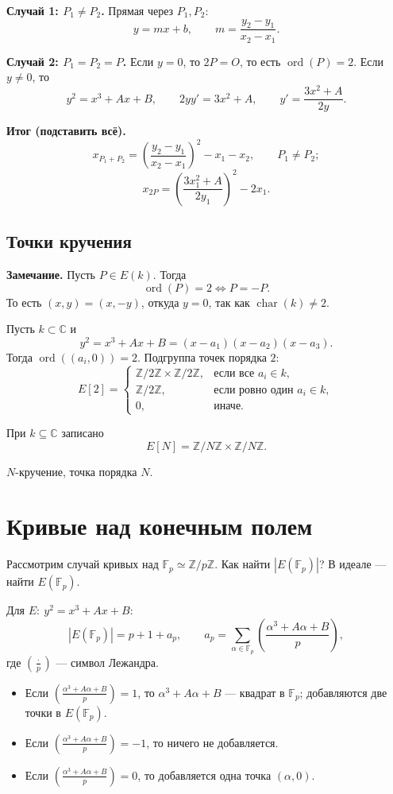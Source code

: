 \documentclass[12pt,a4paper]{article}
\newcommand{\Z}{\mathbb Z}
\newcommand{\CC}{\mathbb C}
\newcommand{\F}{\mathbb F}
\DeclareMathOperator{\ord}{ord}
\DeclareMathOperator{\charop}{char}
\newcommand{\leg}[2]{\left(\frac{#1}{#2}\right)}
\begin{document}
\textbf{Случай 1: $P_1\ne P_2$.} Прямая через $P_1,P_2$:
\[
y=mx+b,\qquad m=\frac{y_2-y_1}{x_2-x_1}.
\]

\textbf{Случай 2: $P_1=P_2=P$.} Если $y=0$, то $2P=O$, то есть
$\ord(P)=2$. Если $y\ne0$, то
\[
y^2=x^3+Ax+B,\qquad 2yy'=3x^2+A,\qquad
y'=\frac{3x^2+A}{2y}.
\]

\textbf{Итог (подставить всё).}
\[
x_{P_1+P_2}=\left(\frac{y_2-y_1}{x_2-x_1}\right)^2-x_1-x_2,
\qquad P_1\ne P_2;
\]
\[
x_{2P}=\left(\frac{3x_1^2+A}{2y_1}\right)^2-2x_1.
\]

\newpage
\subsection*{Точки кручения}
\textbf{Замечание.} Пусть $P\in E(k)$. Тогда
\[
\ord(P)=2\Longleftrightarrow P=-P.
\]
То есть $(x,y)=(x,-y)$, откуда $y=0$, так как $\charop(k)\ne2$.

Пусть $k\subset\CC$ и
\[
y^2=x^3+Ax+B=(x-a_1)(x-a_2)(x-a_3).
\]
Тогда $\ord((a_i,0))=2$. Подгруппа точек порядка $2$:
\[
E[2]=
\begin{cases}
\Z/2\Z\times\Z/2\Z,&\text{если все }a_i\in k,\\
\Z/2\Z,&\text{если ровно один }a_i\in k,\\
0,&\text{иначе}.
\end{cases}
\]

При $k\subseteq\CC$ записано
\[
E[N]=\Z/N\Z\times\Z/N\Z.
\]

$N$-кручение, точка порядка $N$.

\section{Кривые над конечным полем}
Рассмотрим случай кривых над $\F_p\simeq\Z/p\Z$.
Как найти $|E(\F_p)|$? В идеале --- найти $E(\F_p)$.

Для $E:\ y^2=x^3+Ax+B$:
\[
|E(\F_p)|=p+1+a_p,\qquad
a_p=\sum_{\alpha\in\F_p}\leg{\alpha^3+A\alpha+B}{p},
\]
где $\leg{\cdot}{p}$ --- символ Лежандра.

\begin{itemize}[leftmargin=1.6em]
\item Если $\leg{\alpha^3+A\alpha+B}{p}=1$, то $\alpha^3+A\alpha+B$
--- квадрат в $\F_p$; добавляются две точки в $E(\F_p)$.
\item Если $\leg{\alpha^3+A\alpha+B}{p}=-1$, то ничего не добавляется.
\item Если $\leg{\alpha^3+A\alpha+B}{p}=0$, то добавляется одна точка
$(\alpha,0)$.
\end{itemize}
\end{document}
